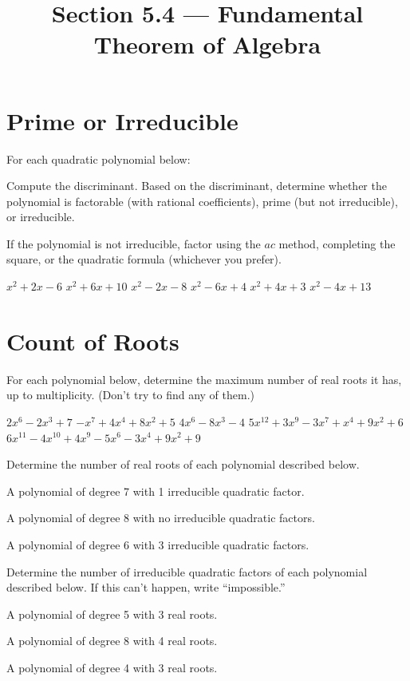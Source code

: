 

\title{Section 5.4 --- Fundamental Theorem of Algebra}

\newcommand{\iqf}{irreducible quadratic factor}


\maketitle

\section*{Prime or Irreducible}
For each quadratic polynomial below:
\begin{clist}
\item Compute the discriminant. Based on the discriminant, determine whether the polynomial is factorable (with rational coefficients), prime (but not irreducible), or irreducible.
\item If the polynomial is not irreducible, factor using the $ac$ method, completing the square, or the quadratic formula (whichever you prefer).
\end{clist}
\begin{smenum}
\mitemxxx
{$x^2+2x-6$}
{$x^2+6x+10$}
{$x^2-2x-8$}
\mitemxxx
{$x^2-6x+4$}
{$x^2+4x+3$}
{$x^2-4x+13$}
\end{smenum}

\section*{Count of Roots}
For each polynomial below, determine the maximum number of real roots it has, up to multiplicity. (Don't try to find any of them.)
\begin{smenum}
\mitemxxx
{$2x^6-2x^3+7$}
{$-x^7+4x^4+8x^2+5$}
{$4x^6-8x^3-4$}
\mitemxx
{$5x^{12}+3x^9-3x^7+x^4+9x^2+6$}
{$6x^{11}-4x^{10}+4x^9-5x^6-3x^4+9x^2+9$}
\end{smenum}
Determine the number of real roots of each polynomial described below.
\begin{senum}
\item A polynomial of degree 7 with 1 irreducible quadratic factor.
\item A polynomial of degree 8 with no irreducible quadratic factors.
\item A polynomial of degree 6 with 3 irreducible quadratic factors.
\end{senum}
Determine the number of irreducible quadratic factors of each polynomial described below. If this can't happen, write ``impossible.''
\begin{senum}
\item A polynomial of degree 5 with 3 real roots.
\item A polynomial of degree 8 with 4 real roots.
\item A polynomial of degree 4 with 3 real roots.
\end{senum}

